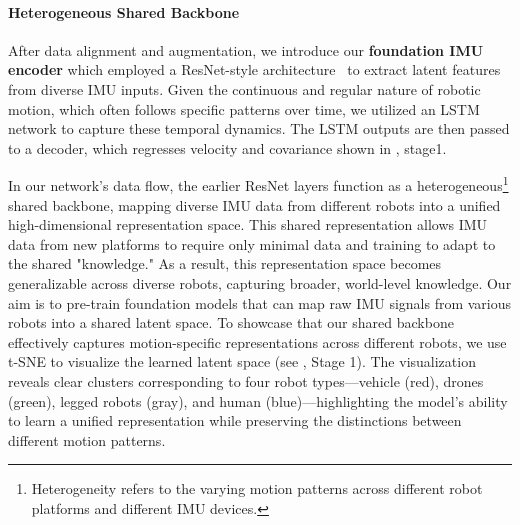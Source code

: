 \paragraph{Heterogeneous Shared Backbone}
After data alignment and augmentation, we introduce our \textbf{foundation IMU encoder} which employed a ResNet-style architecture~\cite{resnet} to extract latent features from diverse IMU inputs. Given the continuous and regular nature of robotic motion, which often follows specific patterns over time, we utilized an LSTM network to capture these temporal dynamics.
The LSTM outputs are then passed to a decoder, which regresses velocity and covariance shown in , stage1.

In our network's data flow, the earlier ResNet layers function as a heterogeneous\footnote{Heterogeneity refers to the varying motion patterns across different robot platforms and different IMU devices.} shared backbone, mapping diverse IMU data from different robots into a unified high-dimensional representation space. This shared representation allows IMU data from new platforms to require only minimal data and training to adapt to the shared "knowledge." As a result, this representation space becomes generalizable across diverse robots, capturing broader, world-level knowledge. Our aim is to pre-train foundation models that can map raw IMU signals from various robots into a shared latent space. {To showcase that our shared backbone effectively captures motion-specific representations across different robots, we use t-SNE to visualize the learned latent space (see , Stage 1). The visualization reveals clear clusters corresponding to four robot types—vehicle (red), drones (green), legged robots (gray), and human (blue)—highlighting the model’s ability to learn a unified representation while preserving the distinctions between different motion patterns.}






